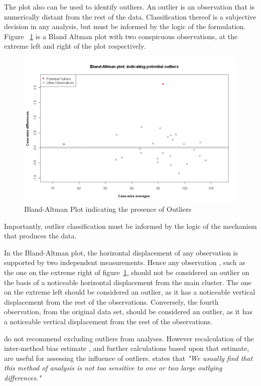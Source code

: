 \documentclass[12pt, a4paper]{report}
\theoremstyle{plain}
\theoremstyle{definition}
\theoremstyle{remark}
\begin{document}
The plot also can be used to identify	outliers. An outlier is an observation that is numerically distant from the rest of the data. Classification thereof is a subjective decision in any analysis, but must be informed by the logic of the formulation. Figure ~\ref{BAOutliers} is a Bland Altman plot with two
	conspicuous observations, at the extreme left and right of the
	plot respectively.
	
	
	\begin{figure}[h!]
		\begin{center}
			\includegraphics[width=125mm]{images/BAOutliers.jpeg}
			\caption{Bland-Altman Plot indicating the presence of Outliers}\label{BAOutliers}
		\end{center}
	\end{figure}
Importantly, outlier classification must be informed by the logic of the
mechanism that produces the data.  
	
In the Bland-Altman plot, the horizontal displacement of any observation is supported by two independent measurements. Hence any observation , such as the one on the extreme right of figure~\ref{BAOutliers}, should not be considered an outlier on the basis of a noticeable horizontal displacement from the main cluster. The one	on the extreme left should be considered an outlier, as it has a noticeable vertical displacement from the rest of the observations. Conversely, the fourth observation, from the original data set, should be considered an outlier, as it has a noticeable vertical displacement from the rest of the observations.

	
\citet*{BA99} do not recommend excluding outliers from analyses. However recalculation of the inter-method bias estimate , and further calculations based upon that estimate, are useful for assessing the influence of outliers.\citep{BA99} states that \emph{"We usually find that this method of analysis is not too sensitive to one or two large outlying differences."}
\end{document}
